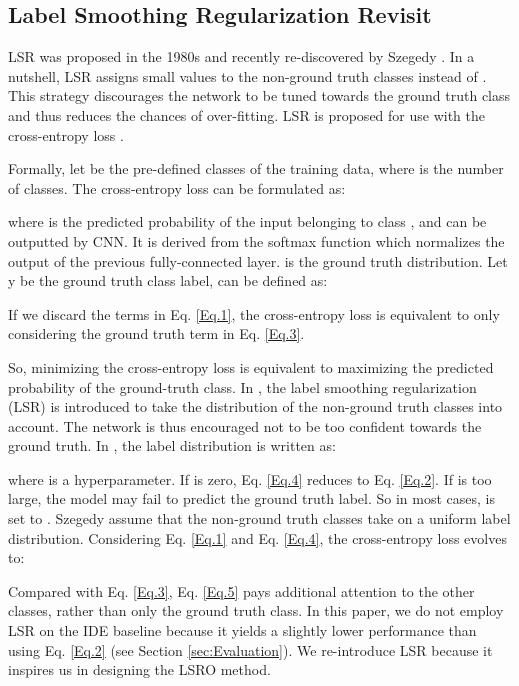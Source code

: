 \documentclass[10pt,twocolumn,letterpaper]{article}
\begin{document}
\subsection{Label Smoothing Regularization Revisit}\label{sec:revisit}
LSR was proposed in the 1980s and recently re-discovered by Szegedy \etal \cite{szegedy2016rethinking}. In a nutshell, LSR assigns small values to the non-ground truth classes instead of . This strategy discourages the network to be tuned towards the ground truth class and thus reduces the chances of over-fitting. LSR is proposed for use with the cross-entropy loss \cite{szegedy2016rethinking}. 

Formally, let  be the pre-defined classes of the training data, where  is the number of classes. The cross-entropy loss can be formulated as:

where  is the predicted probability of the input belonging to class , and can be outputted by CNN. It is derived from the softmax function which normalizes the output of the previous fully-connected layer.  is the ground truth distribution. Let y be the ground truth class label,  can be defined as:

If we discard the  terms in Eq. \ref{Eq.1}, the cross-entropy loss is equivalent to only considering the ground truth term in Eq. \ref{Eq.3}. 

So, minimizing the cross-entropy loss is equivalent to maximizing the predicted probability of the ground-truth class.
In \cite{szegedy2016rethinking}, the label smoothing regularization (LSR) is introduced to take the distribution of the non-ground truth classes into account. The network is thus encouraged not to be too confident towards the ground truth. In \cite{szegedy2016rethinking}, the label distribution  is written as:

where  is a hyperparameter. If  is zero, Eq. \ref{Eq.4} reduces to Eq. \ref{Eq.2}. If  is too large, the model may fail to predict the ground truth label. So in most cases,  is set to . 
Szegedy \etal assume that the non-ground truth classes take on a uniform label distribution. Considering Eq. \ref{Eq.1} and Eq. \ref{Eq.4}, the cross-entropy loss evolves to:

Compared with Eq. \ref{Eq.3}, Eq. \ref{Eq.5} pays additional attention to the other classes, rather than only the ground truth class. In this paper, we do not employ LSR on the IDE baseline because it yields a slightly lower performance than using Eq. \ref{Eq.2} (see Section \ref{sec:Evaluation}). We re-introduce LSR because it inspires us in designing the LSRO method.
\end{document}
